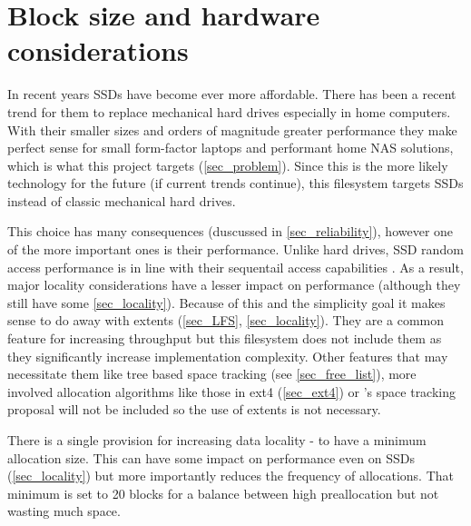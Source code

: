     \section{Block size and hardware considerations}
        \label{sec_block_size}

        In recent years SSDs have become ever more affordable. There has been a
        recent trend for them to replace mechanical hard drives
        \cite{ssd_sales} especially in home computers. With their smaller sizes
        and orders of magnitude greater performance they make perfect sense for
        small form-factor laptops and performant home NAS solutions, which is
        what this project targets (\ref{sec_problem}). Since this is the more
        likely technology for the future (if current trends continue), this
        filesystem targets SSDs instead of classic mechanical hard drives.

        This choice has many consequences (duscussed in \ref{sec_reliability}),
        however one of the more important ones is their performance. Unlike
        hard drives, SSD random access performance is in line with their
        sequentail access capabilities \cite{servethehome_review}. As a result,
        major locality considerations have a lesser impact on performance
        (although they still have some \ref{sec_locality}). Because of this and
        the simplicity goal it makes sense to do away with extents
        (\ref{sec_LFS}, \ref{sec_locality}). They are a common feature for
        increasing throughput but this filesystem does not include them as they
        significantly increase implementation complexity. Other features that
        may necessitate them like tree based space tracking (see
        \ref{sec_free_list}), more involved allocation algorithms like those in
        ext4 (\ref{sec_ext4}) or \citeauthor{ext4_space_maps}'s space tracking
        proposal will not be included so the use of extents is not necessary.

        There is a single provision for increasing data locality - to have a
        minimum allocation size. This can have some impact on performance even
        on SSDs (\ref{sec_locality}) but more importantly reduces the frequency
        of allocations. That minimum is set to 20 blocks for a balance between
        high preallocation but not wasting much space.

